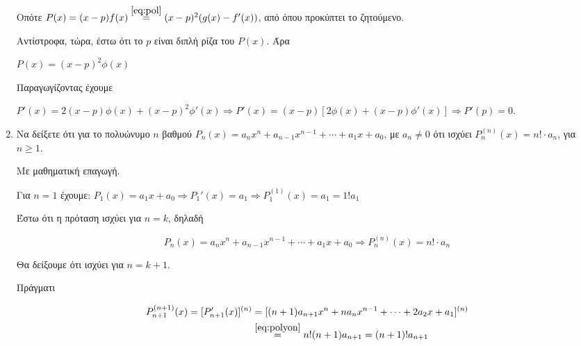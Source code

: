 \begin{enumerate}
			Οπότε $ P(x) = (x-p)f(x) \overset{\eqref{eq:pol}}{=} (x-p)^{2}(g(x)
			- f'(x)) $, από όπου προκύπτει το ζητούμενο.

			Αντίστροφα, τώρα, έστω ότι το $p$ είναι διπλή ρίζα του $ P(x) $. Άρα 

			$ P(x) = (x-p)^{2}\phi(x) $

			Παραγωγίζοντας έχουμε

			$ P'(x) = 2(x-p)\phi(x) + (x-p)^{2}\phi'(x) \Rightarrow P'(x) =
			(x-p)[2\phi(x) + (x-p)\phi'(x)] \Rightarrow P'(p) = 0 $.





	\item Να δείξετε ότι για το πολυώνυμο $n$ βαθμού $ P_{n}(x) =a_{n}x^{n} +
		a_{n-1}x^{n-1} + \cdots + a_{1}x + a_{0} $, με  $ a_{n}\neq 0 $ ότι ισχύει $
		P_{n}^{(n)}(x) = n! \cdot a_{n}$, για  $n\geq 1 $.





		Με μαθηματική επαγωγή.

		Για $ n=1 $ έχουμε: $ P_{1}(x) = a_{1}x + a_{0} \Rightarrow P_{1}'(x) =
		a_{1} \Rightarrow P_{1}^{(1)}(x)
		= a_{1} = 1!a_{1} $ 

		Έστω ότι η πρόταση ισχύει για $ n = k  $, δηλαδή

		\begin{equation}\label{eq:polyon}
			P_{n}(x) = a_{n}x^{n} + a_{n-1}x^{n-1}+ \cdots +a_{1}x + a_{0}
			\Rightarrow P_{n}^{(n)}(x) = n!\cdot a_{n}
		\end{equation}

		Θα δείξουμε ότι ισχύει για $ n = k+1 $.

		Πράγματι

		\begin{align*}
			P_{n+1}^{(n+1)}(x) = [P_{n+1}'(x)]^{(n)} 
			&= [(n+1)a_{n+1}x^{n} +	na_{n}x^{n-1} + \cdots + 2a_{2}x + a_{1}]^{(n)} \\
			&\overset{\eqref{eq:polyon}}{=} n! (n+1) a_{n+1} = (n+1)!a_{n+1}
		\end{align*}	
\end{enumerate}


